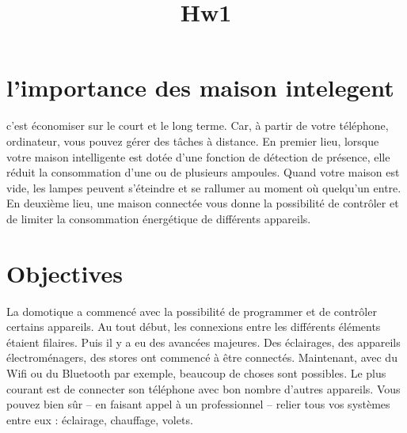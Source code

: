 \documentclass[12pt]{article}
\begin{document}
\title{Hw1}
\maketitle
\section{l'importance des maison intelegent}
c’est économiser sur le court et le long terme. Car, à partir de votre téléphone, ordinateur, vous pouvez gérer des tâches à distance. En premier lieu, lorsque votre maison intelligente est dotée d’une fonction de détection de présence, elle réduit la consommation d’une ou de plusieurs ampoules. Quand votre maison est vide, les lampes peuvent s’éteindre et se rallumer au moment où quelqu’un entre. En deuxième lieu, une maison connectée vous donne la possibilité de contrôler et de limiter la consommation énergétique de différents appareils.\\
\section{Objectives}
La domotique a commencé avec la possibilité de programmer et de contrôler certains appareils. Au tout début, les connexions entre les différents éléments étaient filaires. Puis il y a eu des avancées majeures. Des éclairages, des appareils électroménagers, des stores ont commencé à être connectés. Maintenant, avec du Wifi ou du Bluetooth par exemple, beaucoup de choses sont possibles. Le plus courant est de connecter son téléphone avec bon nombre d’autres appareils. Vous pouvez bien sûr – en faisant appel à un professionnel – relier tous vos systèmes entre eux : éclairage, chauffage, volets.\\
\end{document}
